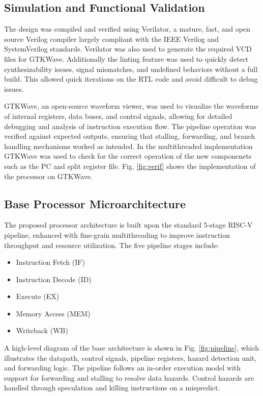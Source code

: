 \documentclass[conference]{IEEEtran}
\begin{document}
\subsection{Simulation and Functional Validation}
\begin{flushleft}
The design was compiled and verified using Verilator, a mature, fast, and open source Verilog compiler largely compliant with the IEEE Verilog and SystemVerilog standards. Verilator was also used to generate the required VCD files for GTKWave. Additionally the linting feature was used to quickly detect synthesizability issues, signal mismatches, and undefined behaviors without a full build. This allowed quick iterations on the RTL code and avoid difficult to debug issues.

GTKWave, an open-source waveform viewer, was used to visualize the waveforms of internal registers, data buses, and control signals, allowing for detailed debugging and analysis of instruction execution flow. The pipeline operation was verified against expected outputs, ensuring that stalling, forwarding, and branch handling mechanisms worked as intended. In the multithreaded implementation GTKWave was used to check for the correct operation of the new componenets such as the PC and split register file. Fig. \ref{fig:verif} shows the implementation of the processor on GTKWave.

\end{flushleft}


\subsection{Base Processor Microarchitecture}
The proposed processor architecture is built upon the standard 5-stage RISC-V pipeline, enhanced with fine-grain multithreading to improve instruction throughput and resource utilization.
The five pipeline stages include:
\begin{itemize}
    \item Instruction Fetch (IF)
\end{itemize}
\begin{itemize}
    \item Instruction Decode (ID)
\end{itemize}
\begin{itemize}
    \item Execute (EX)
\end{itemize}
\begin{itemize}
    \item Memory Access (MEM)
\end{itemize}
\begin{itemize}
    \item Writeback (WB)
\end{itemize}
A high-level diagram of the base architecture is shown in Fig. \ref{fig:pipeline}, which illustrates the datapath, control signals, pipeline registers, hazard detection unit, and forwarding logic. The pipeline follows an in-order execution model with support for forwarding and stalling to resolve data hazards. Control hazards are handled through speculation and killing instructions on a mispredict.
\end{document}
